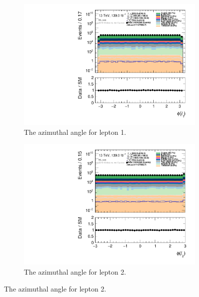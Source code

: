 \begin{figure}[H]
\begin{subfigure}[t!]{0.49\textwidth}
        \includegraphics[width=\textwidth]{Figures/ML_cuts/hist1d_lepPhi[0]_ML_cuts.pdf}
    \caption{The azimuthal angle for lepton 1.}
    \label{fig:my_label}
    \end{subfigure}
    \begin{subfigure}[t!]{0.49\textwidth}
        \includegraphics[width=\textwidth]{Figures/ML_cuts/hist1d_lepPhi[1]_ML_cuts.pdf}
    \caption{The azimuthal angle for lepton 2.}
    \label{fig:my_label}
    \end{subfigure}
\end{figure}

